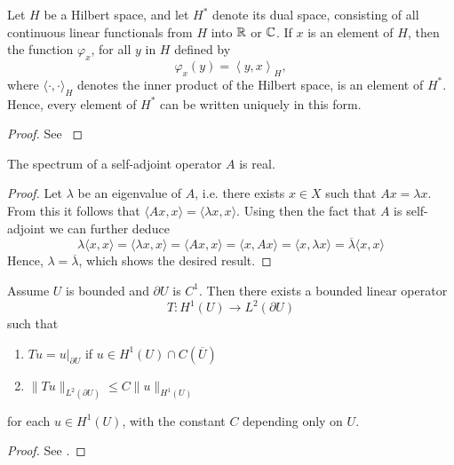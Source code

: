 \begin{atheorem}
	Let $H$ be a Hilbert space, and let $H^{*}$ denote its dual space, consisting of all continuous linear functionals from $H$ into $\mathbb{R}$ or $\mathbb{C}$. If $x$ is an element of $H$, then the function $\varphi_{x}$, for all $y$ in $H$ defined by
	\[ \varphi_{x}(y) = \left\langle y,x\right\rangle_{H}, \]
	where $\langle \cdot ,\cdot \rangle_{H}$ denotes the inner product of the Hilbert space, is an element of $H^{*}$. Hence, every element of $H^{*}$ can be written uniquely in this form.
	
	\begin{proof}
		See \cite[p. 284]{evans1998partial}
	\end{proof}
\end{atheorem}

\begin{atheorem} \label{spectrul-sa-real}
	The spectrum of a self-adjoint operator $A$ is real. 
	
	\begin{proof}
		Let $\lambda$ be an eigenvalue of $A$, i.e. there exists $x \in X$ such that $A x = \lambda x$. From this it follows that $\langle A x, x \rangle = \langle \lambda x , x \rangle$. Using then the fact that $A$ is self-adjoint we can further deduce
		\[ \lambda \langle x , x \rangle = \langle \lambda x , x \rangle = \langle A x, x \rangle = \langle x, A x \rangle = \langle x , \lambda x \rangle = \overline{\lambda} \langle  x , x \rangle \]
		Hence, $\lambda = \overline{\lambda}$, which shows the desired result.
	\end{proof}
\end{atheorem}

\begin{atheorem}
	Assume $U$ is bounded and $\partial U$ is $C^{1}$. Then there exists a bounded linear operator
		\[ T \colon H^{1}(U) \rightarrow L^{2}(\partial U) \]
	such that
	\begin{enumerate}[label=\alph*\upshape)]
		\item $Tu = u\big|_{\partial U}$ if $u \in H^{1}(U) \cap C(\overline{U})$
		\item $\|Tu\|_{L^{2}(\partial U)} \leq C \|u\|_{H^{1}(U)}$
	\end{enumerate}
	for each $u \in H^{1}(U)$, with the constant $C$ depending only on $U$.
	
	\begin{proof}
		See \cite[p. 258]{evans1998partial}.
	\end{proof}
\end{atheorem}

